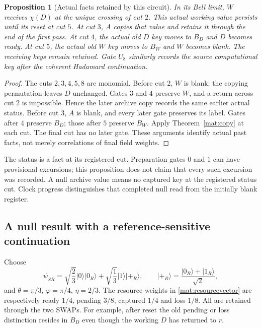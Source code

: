 \documentclass[11pt]{article}
\newtheorem{proposition}[theorem]{Proposition}
\theoremstyle{definition}\newtheorem{definition}[theorem]{Definition}
\theoremstyle{remark}\newtheorem{remark}[theorem]{Remark}
\begin{document}
\begin{proposition}[Actual facts retained by this circuit]
\label{mat:resourcehistory}
In its Bell limit, $W$ receives $\chi(D)$ at the unique crossing of
cut $2$.  This actual working value persists until its reset at
cut $5$.  At cut $3$, $A$ copies that value and retains it through
the end of the first pass.  At cut $4$, the actual old $D$ key moves
to $B_D$ and $D$ becomes ready.  At cut $5$, the actual old $W$ key
moves to $B_W$ and $W$ becomes blank.  The receiving keys remain
retained.  Gate $U_8$ similarly records the source computational key
after the coherent Hadamard continuation.
\end{proposition}
\begin{proof}
The cuts $2,3,4,5,8$ are monomial.  Before cut $2$, $W$ is blank;
the copying permutation leaves $D$ unchanged.  Gates $3$ and $4$
preserve $W$, and a return across cut $2$ is impossible.  Hence the
later archive copy records the same earlier actual status.
Before cut $3$, $A$ is blank, and every later gate preserves its
label.  Gates after $4$ preserve $B_D$; those after $5$ preserve
$B_W$.  Apply Theorem~\ref{mat:copy} at each cut.  The final cut has
no later gate.  These arguments identify actual past facts, not
merely correlations of final field weights.
\end{proof}
The status is a fact at its registered cut.  Preparation gates $0$
and $1$ can have provisional excursions; this proposition does not
claim that every such excursion was recorded.  A null archive value
means no captured key at the registered status cut.  Clock progress
distinguishes that completed null read from the initially blank
register.

\subsection{A null result with a reference-sensitive continuation}

Choose
\begin{equation}\label{mat:input}
 \psi_{SR}=\sqrt{\frac23}|0\rangle|0_R\rangle+
           \sqrt{\frac13}|1\rangle|+_R\rangle,
 \qquad |+_R\rangle=\frac{|0_R\rangle+|1_R\rangle}{\sqrt2},
\end{equation}
and $\theta=\pi/3$, $\varphi=\pi/4$, $\eta=2/3$.
The resource weights in \eqref{mat:resourcevector} are respectively
ready $1/4$, pending $3/8$, captured $1/4$ and loss $1/8$.
All are retained through the two SWAPs.  For example, after reset
the old pending or loss distinction resides in $B_D$ even though
the working $D$ has returned to $r$.
\end{document}
